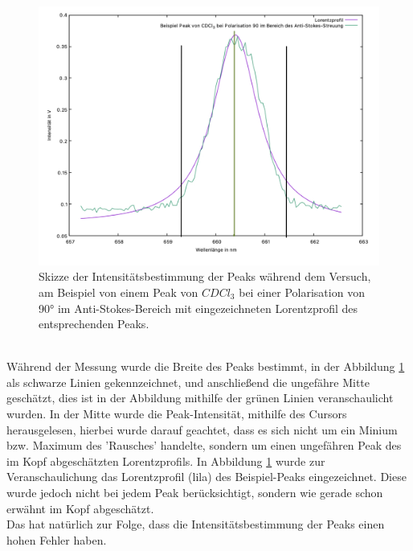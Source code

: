 \begin{figure}[h]
    \centering
    \includegraphics[scale=0.3]{Bilder/Verbesserung_Versuch/plot2.jpg}
    \caption{Skizze der Intensitätsbestimmung der Peaks während dem Versuch, am Beispiel von einem Peak von $CDCl_3$ bei einer Polarisation von 90° im Anti-Stokes-Bereich mit 
    eingezeichneten Lorentzprofil des entsprechenden Peaks.}
    \label{fig:Versuch}
\end{figure}\\
Während der Messung wurde die Breite des Peaks bestimmt, in der Abbildung \ref{fig:Versuch} als schwarze Linien gekennzeichnet, und 
anschließend die ungefähre Mitte geschätzt, dies ist in der Abbildung mithilfe der grünen Linien veranschaulicht wurden. 
In der Mitte wurde die 
Peak-Intensität, mithilfe des Cursors herausgelesen, hierbei wurde darauf geachtet, dass es sich nicht 
um ein Minium bzw. Maximum des 'Rausches' handelte, sondern um einen ungefähren Peak 
des im Kopf abgeschätzten Lorentzprofils. In Abbildung \ref{fig:Versuch} wurde zur Veranschaulichung das Lorentzprofil (lila) des Beispiel-Peaks eingezeichnet. 
Diese wurde jedoch nicht bei jedem Peak berücksichtigt, sondern wie gerade schon erwähnt im Kopf abgeschätzt.\\
Das hat natürlich zur Folge, dass die Intensitätsbestimmung der Peaks einen hohen Fehler haben.

  